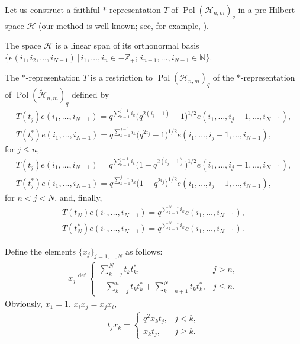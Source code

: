\documentclass[11pt]{article}
\begin{document}
Let us construct a faithful $*$-representation $T$ of $\operatorname{Pol}(\mathscr{H}_{n,m})_q$ in a
pre-Hilbert space $\mathscr{H}$ (our method is well known; see, for example, \cite{polmat}).

The space $\mathscr{H}$ is a linear span of its orthonormal basis
$\{e(i_1,i_2,\ldots,i_{N-1})\, |\,i_1,\ldots,i_n\in-\mathbb{Z}_+$; $i_{n+1}, \ldots,i_{N-1}\in\mathbb{N}\}$.

The $*$-representation $T$ is a restriction to $\operatorname{Pol}(\mathscr{H}_{n,m})_q$ of the
$*$-representation of $\operatorname{Pol}(\widetilde{\mathscr{H}}_{n,m})_q$ def\/ined by
\begin{gather*}
T(t_j)e(i_1,\ldots,i_{N-1})  = q^{\sum\limits_{k=1}^{j-1}i_k} \big(q^{2(i_j-1)}-1\big)^{1/2}
e(i_1,\ldots,i_j-1,\ldots,i_{N-1}),
\\ T(t_j^*)e(i_1,\ldots,i_{N-1})  =
q^{\sum\limits_{k=1}^{j-1}i_k} \big(q^{2i_j}-1\big)^{1/2} e(i_1,\ldots,i_j+1,\ldots,i_{N-1}),
\end{gather*}
for $j\le n$,
\begin{gather*}
T(t_j)e(i_1,\ldots,i_{N-1})  = q^{\sum\limits_{k=1}^{j-1}i_k} \big(1-q^{2(i_j-1)}\big)^{1/2}
e(i_1,\ldots,i_j-1,\ldots,i_{N-1}),
\\ T(t_j^*)e(i_1,\ldots,i_{N-1})  =
q^{\sum\limits_{k=1}^{j-1}i_k} \big(1-q^{2i_j}\big)^{1/2} e(i_1,\ldots,i_j+1,\ldots,i_{N-1}),
\end{gather*}
for $n<j<N$, and, f\/inally,
\begin{gather*}
T(t_N)e(i_1,\ldots,i_{N-1})  = q^{\sum\limits_{k=1}^{N-1}i_k}e(i_1,\ldots,i_{N-1}),
\\ T(t_N^*)e(i_1,\ldots,i_{N-1})  =
q^{\sum\limits_{k=1}^{N-1}i_k}e(i_1,\ldots,i_{N-1}).
\end{gather*}

Def\/ine the elements $\{x_j\}_{j=1,\ldots,N}$ as follows:
\begin{gather}\label{x_j}
x_j\overset{\mathrm{def}}{=}
\begin{cases}
\sum\limits_{k=j}^Nt_kt_k^*, & j>n,
\\ -\sum\limits_{k=j}^nt_kt_k^*+\sum\limits_{k=n+1}^Nt_kt_k^*, & j\le n.
\end{cases}
\end{gather}
Obviously, $x_1=1$, $x_ix_j=x_jx_i$,
\begin{gather}\label{t_jx_k}
t_jx_k=
\begin{cases}
q^2x_kt_j, & j<k,
\\ x_kt_j, & j\ge k.
\end{cases}
\end{gather}
\end{document}

